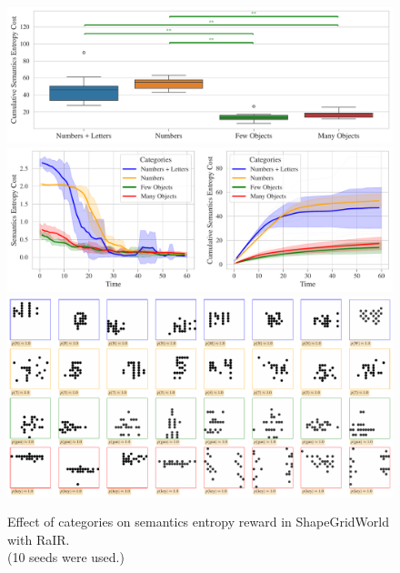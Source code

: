 \begin{figure}[H]
    \centering
    \includegraphics[width=\textwidth]{images/categories_boxplot_sgw_rair_cropped.pdf}\vspace{6pt}
    \includegraphics[width=\textwidth]{images/categories_comparison_sgw_rair.pdf}\vspace{6pt}
    \includegraphics[width=\textwidth]{images/categories_samples_sgw_rair.pdf}\vspace{3pt}
    \captionsetup{justification=centering}
    \caption[Effect of categories on semantics entropy reward in ShapeGridWorld.]{Effect of categories on semantics entropy reward in ShapeGridWorld with RaIR.\\(10 seeds were used.)}
    \label{fig:categories-sgw}
\end{figure}

